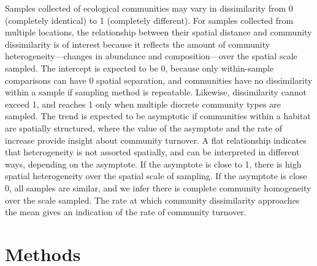 \documentclass[11pt,letterpaper]{article} %
\begin{document}
Samples collected of ecological communities may vary in dissimilarity from 0 (completely identical) to 1 (completely different).
For samples collected from multiple locations, the relationship between their spatial distance and community dissimilarity is of interest because it reflects the amount of community heterogeneity---changes in abundance and composition---over the spatial scale sampled.
The intercept is expected to be 0, because only within-sample comparisons can have 0 spatial separation, and communities have no dissimilarity within a sample if sampling method is repeatable. %
Likewise, dissimilarity cannot exceed 1, and reaches 1 only when multiple discrete community types are sampled.
The trend is expected to be asymptotic if communities within a habitat are spatially structured, where the value of the asymptote and the rate of increase provide insight about community turnover.
A flat relationship indicates that heterogeneity is not assorted spatially, and can be interpreted in different ways, depending on the asymptote. %
If the asymptote is close to 1, there is high spatial heterogeneity over the spatial scale of sampling.
If the asymptote is close 0, all samples are similar, and we infer there is complete community homogeneity over the scale sampled.
The rate at which community dissimilarity approaches the mean gives an indication of the rate of community turnover.

\section*{Methods}
\end{document}
